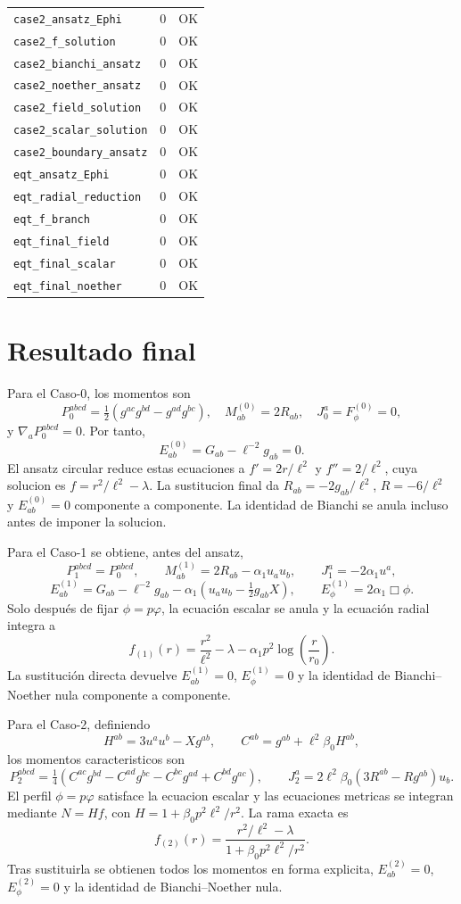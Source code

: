 \documentclass[11pt,a4paper]{article}
\begin{document}
\begin{longtable}{p{}cc}
\texttt{case2\_ansatz\_Ephi} & $0$ & OK\\
\texttt{case2\_f\_solution} & $0$ & OK\\
\texttt{case2\_bianchi\_ansatz} & $0$ & OK\\
\texttt{case2\_noether\_ansatz} & $0$ & OK\\
\texttt{case2\_field\_solution} & $0$ & OK\\
\texttt{case2\_scalar\_solution} & $0$ & OK\\
\texttt{case2\_boundary\_ansatz} & $0$ & OK\\
\texttt{eqt\_ansatz\_Ephi} & $0$ & OK\\
\texttt{eqt\_radial\_reduction} & $0$ & OK\\
\texttt{eqt\_f\_branch} & $0$ & OK\\
\texttt{eqt\_final\_field} & $0$ & OK\\
\texttt{eqt\_final\_scalar} & $0$ & OK\\
\texttt{eqt\_final\_noether} & $0$ & OK\\
\bottomrule
\end{longtable}

\section{Resultado final}
Para el Caso-0, los momentos son
\[
P_0^{abcd}=\tfrac12(g^{ac}g^{bd}-g^{ad}g^{bc}),\quad
M^{(0)}_{ab}=2R_{ab},\quad J_0^a=F_\phi^{(0)}=0,
\]
y $\nabla_aP_0^{abcd}=0$. Por tanto,
\[
E^{(0)}_{ab}=G_{ab}-\ell^{-2}g_{ab}=0.
\]
El ansatz circular reduce estas ecuaciones a $f'=2r/\ell^2$ y
$f''=2/\ell^2$, cuya solucion es $f=r^2/\ell^2-\lambda$. La sustitucion final
da $R_{ab}=-2g_{ab}/\ell^2$, $R=-6/\ell^2$ y $E^{(0)}_{ab}=0$ componente a
componente. La identidad de Bianchi se anula incluso antes de imponer la solucion.

Para el Caso-1 se obtiene, antes del ansatz,
\[
P_1^{abcd}=P_0^{abcd},\qquad
M^{(1)}_{ab}=2R_{ab}-\alpha_1u_au_b,\qquad
J_1^a=-2\alpha_1u^a,
\]
\[
E^{(1)}_{ab}=G_{ab}-\ell^{-2}g_{ab}
-\alpha_1\left(u_au_b-\tfrac12g_{ab}X\right),
\qquad E^{(1)}_\phi=2\alpha_1\Box\phi.
\]
Solo después de fijar $\phi=p\varphi$, la ecuación escalar se anula y la ecuación
radial integra a
\[
f_{(1)}(r)=\frac{r^2}{\ell^2}-\lambda
-\alpha_1p^2\log\left(\frac r{r_0}\right).
\]
La sustitución directa devuelve $E^{(1)}_{ab}=0$, $E^{(1)}_\phi=0$ y la identidad
de Bianchi--Noether nula componente a componente.

Para el Caso-2, definiendo
\[
H^{ab}=3u^au^b-Xg^{ab},\qquad
C^{ab}=g^{ab}+\ell^2\beta_0H^{ab},
\]
los momentos caracteristicos son
\[
P_2^{abcd}=\tfrac14(C^{ac}g^{bd}-C^{ad}g^{bc}-C^{bc}g^{ad}+C^{bd}g^{ac}),
\qquad
J_2^a=2\ell^2\beta_0(3R^{ab}-Rg^{ab})u_b.
\]
El perfil $\phi=p\varphi$ satisface la ecuacion escalar y las ecuaciones metricas
se integran mediante $N=Hf$, con $H=1+\beta_0p^2\ell^2/r^2$. La rama exacta es
\[
f_{(2)}(r)=\frac{r^2/\ell^2-\lambda}
{1+\beta_0p^2\ell^2/r^2}.
\]
Tras sustituirla se obtienen todos los momentos en forma explicita,
$E^{(2)}_{ab}=0$, $E^{(2)}_\phi=0$ y la identidad de Bianchi--Noether nula.
\end{document}
